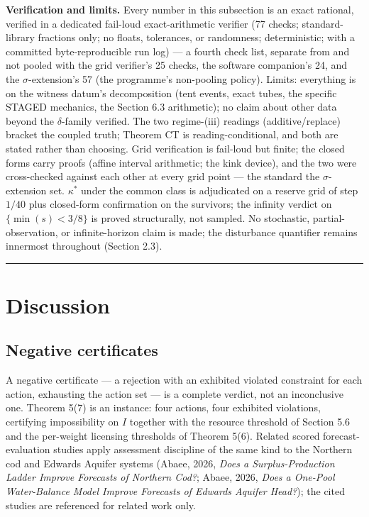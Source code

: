 \documentclass[3p,11pt]{elsarticle}
\begin{document}
\textbf{Verification and limits.} Every number in this subsection
is an exact rational, verified in a dedicated fail-loud exact-arithmetic
verifier (77 checks; standard-library fractions only; no floats,
tolerances, or randomness; deterministic; with a committed
byte-reproducible run log) --- a fourth check list, separate from and
not pooled with the grid verifier's 25 checks, the software companion's
24, and the \(\sigma\)-extension's 57 (the programme's non-pooling
policy). Limits: everything is on the witness datum's
decomposition (tent events, exact tubes, the specific STAGED mechanics,
the Section 6.3 arithmetic); no claim about other data beyond the
\(\delta\)-family verified. The two regime-(iii) readings
(additive/replace) bracket the coupled truth; Theorem CT is
reading-conditional, and both are stated rather than choosing. Grid
verification is fail-loud but finite; the closed forms carry proofs
(affine interval arithmetic; the kink device), and the two were
cross-checked against each other at every grid point --- the standard
the \(\sigma\)-extension set. \(\kappa^*\) under the common class
is adjudicated on a reserve grid of step \(1/40\) plus closed-form
confirmation on the survivors; the infinity verdict on \(\{\min(s) <
3/8\}\) is proved structurally, not sampled. No stochastic,
partial-observation, or infinite-horizon claim is made; the disturbance
quantifier remains innermost throughout (Section 2.3).

\begin{center}\rule{0.5\linewidth}{0.5pt}\end{center}

\section{Discussion}\label{discussion}

\subsection{Negative certificates}\label{negative-certificates}

A negative certificate --- a rejection with an exhibited violated constraint for each action, exhausting the action set --- is a complete verdict, not an inconclusive one. Theorem 5(7) is an instance: four actions, four exhibited violations, certifying impossibility on \(I\) together with the resource threshold of Section 5.6 and the per-weight licensing thresholds of Theorem 5(6). Related scored forecast-evaluation studies apply assessment discipline of the same kind to the Northern cod and Edwards Aquifer systems (Abaee, 2026, \emph{Does a Surplus-Production Ladder Improve Forecasts of Northern Cod?}; Abaee, 2026, \emph{Does a One-Pool Water-Balance Model Improve Forecasts of Edwards Aquifer Head?}); the cited studies are referenced for related work only.
\end{document}
